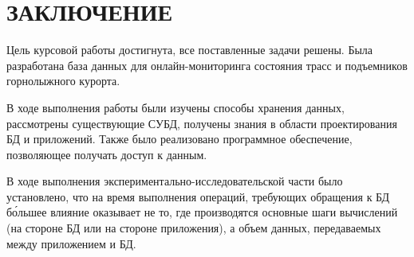\chapter*{ЗАКЛЮЧЕНИЕ}


Цель курсовой работы достигнута, все поставленные задачи решены. Была разработана база данных для онлайн-мониторинга состояния трасс и подъемников горнолыжного курорта. 


В ходе выполнения работы были изучены способы хранения данных, рассмотрены существующие СУБД, получены знания в области проектирования БД и приложений. Также было реализовано программное обеспечение, позволяющее получать доступ к данным.

В ходе выполнения экспериментально-исследовательской части было установлено, что на время выполнения операций, требующих обращения к БД б\'{о}льшее влияние оказывает не то, где производятся основные шаги вычислений (на стороне БД или на стороне приложения), а объем данных, передаваемых между приложением и БД.



